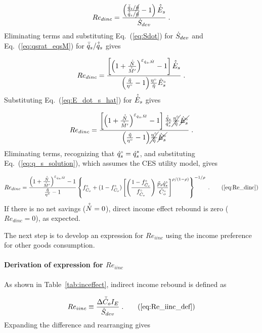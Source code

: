 \begin{equation}
  Re_{dinc} = \frac{\left( \frac{\bar{\dot{q}}_s / \cancel{\tilde{\eta}}}{\hat{\dot{q}}_s / \cancel{\tilde{\eta}}} - 1  \right) \hat{\dot{E}}_s} 
              {\dot{S}_{dev}} \; .
\end{equation}
%
Eliminating terms and substituting Eq.~(\ref{eq:Sdot}) for $\dot{S}_{dev}$ and
Eq.~(\ref{eq:qsrat_eqsM}) for $\bar{\dot{q}}_s / \hat{\dot{q}}_s$ gives

\begin{equation}
  Re_{dinc} = \frac{\left[ \left( 1 + \frac{\hat{\dot{N}}}{\hat{\dot{M}}^\prime} \right) ^{\varepsilon_{\dot{q}_s\!,\dot{M}}} - 1  \right] \hat{\dot{E}}_s} 
              {\left( \frac{\tilde{\eta}}{{}{\eta}^{\scriptscriptstyle \circ}} - 1 \right)\! \frac{{}{\eta}^{\scriptscriptstyle \circ}}{\tilde{\eta}} {}{\dot{E}}^{\scriptscriptstyle \circ}_s} \; .
\end{equation}
%
Substituting Eq.~(\ref{eq:E_dot_s_hat}) for $\hat{\dot{E}}_s$ gives

\begin{equation}
  Re_{dinc} = \frac{\left[ \left( 1 + \frac{\hat{\dot{N}}}{\hat{\dot{M}}^\prime} \right) ^{\varepsilon_{\dot{q}_s\!,\dot{M}}} - 1  \right] 
                  \frac{\hat{\dot{q}}_s}{{\dot{q}}^*_s}
                \cancel{\frac{{}{\eta}^{\scriptscriptstyle \circ}}{\tilde{\eta}}}
                \cancel{{}{\dot{E}}^{\scriptscriptstyle \circ}_s}}
              {\left( \frac{\tilde{\eta}}{{}{\eta}^{\scriptscriptstyle \circ}} - 1 \right)\! 
                  \cancel{\frac{{}{\eta}^{\scriptscriptstyle \circ}}{\tilde{\eta}}} \cancel{{}{\dot{E}}^{\scriptscriptstyle \circ}_s}} \; .
\end{equation}
%
Eliminating terms, recognizing that 
${}{\dot{q}}^{\scriptscriptstyle \circ}_s = {\dot{q}}^*_s$, and substituting Eq.~(\ref{eq:q_s_solution}), 
which assumes the CES utility model,
gives

\begin{equation} 
  Re_{dinc} = \Redinceqnexact{} \; . \tag{\ref{eq:Re_dinc}}
\end{equation}
%
If there is no net savings ($\hat{\dot{N}} = 0$), 
direct income effect rebound is zero ($Re_{dinc} = 0$), as expected.

The next step is to develop an expression for $Re_{iinc}$
using the income preference for other goods consumption.


\paragraph{Derivation of expression for $Re_{iinc}$}
\label{sec:Re_iinc}

As shown in Table~\ref{tab:inceffect}, indirect income rebound is defined as

\begin{equation}
  Re_{iinc} \equiv \frac{\Delta \rainc{C}_o I_E}{\Sdot} \; . \tag{\ref{eq:Re_iinc_def}}
\end{equation}
%
Expanding the difference and rearranging gives


